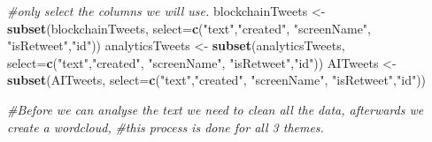 \documentclass[]{article}
\newenvironment{Shaded}{\begin{snugshade}}{\end{snugshade}}
\newcommand{\KeywordTok}[1]{\textcolor[rgb]{0.13,0.29,0.53}{\textbf{#1}}}
\newcommand{\DataTypeTok}[1]{\textcolor[rgb]{0.13,0.29,0.53}{#1}}
\newcommand{\StringTok}[1]{\textcolor[rgb]{0.31,0.60,0.02}{#1}}
\newcommand{\CommentTok}[1]{\textcolor[rgb]{0.56,0.35,0.01}{\textit{#1}}}
\newcommand{\NormalTok}[1]{#1}
\begin{document}
\begin{Shaded}
\begin{Highlighting}[]
\CommentTok{#only select the columns we will use.}
\NormalTok{blockchainTweets <-}\StringTok{ }\KeywordTok{subset}\NormalTok{(blockchainTweets, }\DataTypeTok{select=}\KeywordTok{c}\NormalTok{(}\StringTok{"text"}\NormalTok{,}\StringTok{"created"}\NormalTok{,}
                                                      \StringTok{"screenName"}\NormalTok{, }\StringTok{"isRetweet"}\NormalTok{,}\StringTok{"id"}\NormalTok{)) }
\NormalTok{analyticsTweets <-}\StringTok{ }\KeywordTok{subset}\NormalTok{(analyticsTweets, }\DataTypeTok{select=}\KeywordTok{c}\NormalTok{(}\StringTok{"text"}\NormalTok{,}\StringTok{"created"}\NormalTok{,}
                                                    \StringTok{"screenName"}\NormalTok{, }\StringTok{"isRetweet"}\NormalTok{,}\StringTok{"id"}\NormalTok{))}
\NormalTok{AITweets <-}\StringTok{ }\KeywordTok{subset}\NormalTok{(AITweets, }\DataTypeTok{select=}\KeywordTok{c}\NormalTok{(}\StringTok{"text"}\NormalTok{,}\StringTok{"created"}\NormalTok{,}
                                                      \StringTok{"screenName"}\NormalTok{, }\StringTok{"isRetweet"}\NormalTok{,}\StringTok{"id"}\NormalTok{))}

\CommentTok{#Before we can analyse the text we need to clean all the data, afterwards we create a wordcloud,}
\CommentTok{#this process is done for all 3 themes.}


\end{Highlighting}
\end{Shaded}
\end{document}
